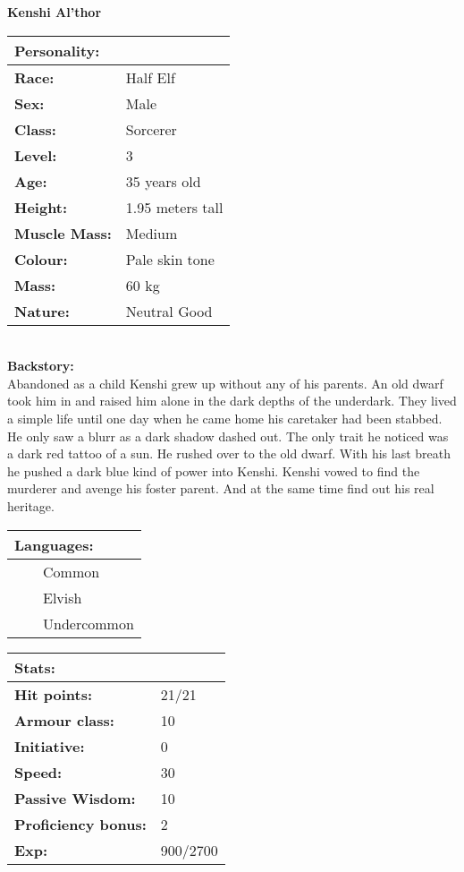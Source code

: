 \documentclass[11pt]{article}
\newcommand{\tabitem}{~~\llap{--}~~}
\begin{document}
	\begin{center}
\Huge \textbf{Kenshi Al'thor}
	\end{center}
	\begin{multicols}{2}
\noindent \begin{tabularx}{95mm}{@{}l l}
\Large \textbf{Personality:} 	& 						\\
\hline
\textbf{Race:} 					& Half Elf	 			\\
\textbf{Sex:} 					& Male 					\\
\textbf{Class:}					& Sorcerer				\\
\textbf{Level:} 				& 3		 				\\
\textbf{Age:} 					& 35 years old			\\
\textbf{Height:} 				& 1.95 meters tall 		\\
\textbf{Muscle Mass:} 			& Medium 				\\
\textbf{Colour:} 				& Pale skin tone	 	\\
\textbf{Mass:} 					& 60 kg		 			\\
\textbf{Nature:} 				& Neutral Good	 		\\
		\end{tabularx} \\
\textbf{Backstory:} \\
Abandoned as a child Kenshi grew up without any of his parents. An old dwarf took him in and raised him alone in the dark depths of the underdark. They lived a simple life until one day when he came home his caretaker had been stabbed. He only saw a blurr as a dark shadow dashed out. The only trait he noticed was a dark red tattoo of a sun. He rushed over to the old dwarf. With his last breath he pushed a dark blue kind of power into Kenshi. Kenshi vowed to find the murderer and avenge his foster parent. And at the same time find out his real heritage.

\noindent \begin{tabularx}{95mm}{@{}l}
{\Large \textbf{Languages:}} \\
\hline
\tabitem Common \\
\tabitem Elvish \\
\tabitem Undercommon
		\end{tabularx}

\vspace{4mm}

\noindent \begin{tabularx}{95mm}{@{}l l}
\Large \textbf{Stats:}		 	& 									\\
\hline
\textbf{Hit points:} 			& 21/21 							\\
\textbf{Armour class:} 			& 10							 	\\
\textbf{Initiative:} 			& 0									\\
\textbf{Speed:} 				& 30		 						\\
\textbf{Passive Wisdom:} 		& 10			 					\\
\textbf{Proficiency bonus:}		& 2									\\
\textbf{Exp:} 					& 900/2700 							\\
		\end{tabularx}


\end{multicols}
\end{document}
